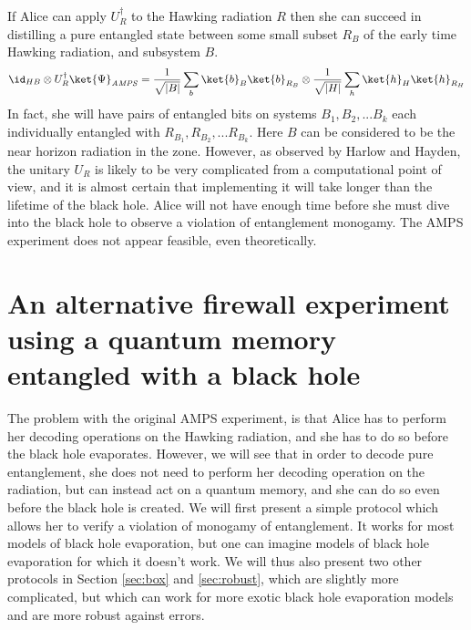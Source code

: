 \documentclass[12pt,a4paper]{article}
\begin{document}
If Alice can apply  $U^\dagger_R$ to the  Hawking radiation $R$ then she can succeed in distilling a pure entangled state 
between some small subset $R_B$ of the early time Hawking radiation, and subsystem $B$.
\begin{align}
\id_{HB}\otimes U^\dagger_R\ket{\Psi}_{\mathit{AMPS}}= \frac{1}{\sqrt{|B|}}\sum_{b}\ket{b}_B\ket{b}_{R_B}\otimes\frac{1}{\sqrt{|H|}}\sum_{h}\ket{h}_H\ket{h}_{R_H}
\end{align}
In fact, she will have pairs of entangled bits on systems $B_1,B_2,...B_k$ each individually entangled with  $R_{B_1},R_{B_2},...R_{B_k}$. Here $B$ can be considered to be the near horizon radiation in the zone. However, as observed by Harlow and Hayden, the unitary $U_R$ is likely to be very complicated from a computational point of view, and it is almost certain that implementing it will take longer than the lifetime of the black hole. Alice will not have enough time before she must dive into the black hole to observe a violation of entanglement monogamy. The AMPS experiment does not appear feasible, even theoretically.


 
\section{An alternative firewall experiment using a quantum memory entangled with a black hole}
\label{sec:alternative}

The problem with the original AMPS experiment, is that Alice has to perform her decoding operations on the Hawking radiation, and she has to do so before the black hole evaporates. However, we will see that in order to decode pure entanglement, she does not need to perform her decoding operation on the radiation, but can instead act on a quantum memory, and she can do so even before the black hole is created. We will first present a simple protocol which allows her to verify a violation of monogamy of entanglement. 
It works for most models of black hole evaporation, but one can imagine models of black hole evaporation for which it doesn't work. We will thus also present two other protocols in Section \ref{sec:box} and \ref{sec:robust}, which are slightly more complicated, but which can work for more exotic black hole evaporation models and are more robust against errors.
\end{document}
